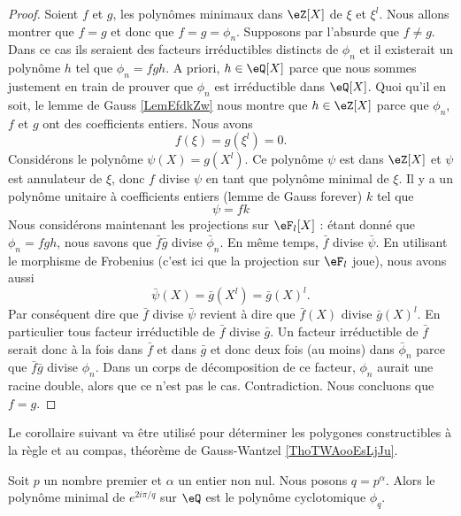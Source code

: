 \begin{proof}
    Soient \( f\) et \( g\), les polynômes minimaux dans \( \eZ[X]\) de \( \xi\) et \( \xi^l\). Nous allons montrer que \( f=g\) et donc que \( f=g=\phi_n\). Supposons par l'absurde que \( f\neq g\). Dans ce cas ils seraient des facteurs irréductibles distincts de \( \phi_n\) et il existerait un polynôme \( h\) tel que \( \phi_n=fgh\). A priori, \( h\in \eQ[X]\) parce que nous sommes justement en train de prouver que \( \phi_n\) est irréductible dans \( \eQ[X]\). Quoi qu'il en soit, le lemme de Gauss \ref{LemEfdkZw} nous montre que \( h\in \eZ[X]\) parce que \( \phi_n\), \( f\) et \( g\) ont des coefficients entiers. Nous avons
    \begin{equation}
        f(\xi)=g(\xi^l)=0.
    \end{equation}
    Considérons le polynôme \( \psi(X)=g(X^l)\). Ce polynôme \( \psi\) est dans \( \eZ[X]\) et \( \psi\) est annulateur de \( \xi\), donc \( f\) divise \( \psi\) en tant que polynôme minimal de \( \xi\). Il y a un polynôme unitaire à coefficients entiers (lemme de Gauss forever) \( k\) tel que
    \begin{equation}
        \psi=fk
    \end{equation}
    Nous considérons maintenant les projections sur \( \eF_l[X]\) : étant donné que \( \phi_n=fgh\), nous savons que \( \bar f\bar g\) divise \( \bar\phi_n\). En même temps, \( \bar f\) divise \( \bar \psi\). En utilisant le morphisme de Frobenius (c'est ici que la projection sur \( \eF_l\) joue), nous avons aussi
    \begin{equation}
        \bar\psi(X)=\bar g(X^l)=\bar g(X)^l.
    \end{equation}
    Par conséquent dire que \( \bar f\) divise \( \bar\psi\) revient à dire que \( \bar f(X)\) divise \( \bar g(X)^l\). En particulier tous facteur irréductible de \( \bar f\) divise \( \bar g\). Un facteur irréductible de \( \bar f\) serait donc à la fois dans \( \bar f\) et dans \( \bar g\) et donc deux fois (au moins) dans \( \bar\phi_n\) parce que \( \bar f\bar g\) divise \( \phi_n\). Dans un corps de décomposition de ce facteur, \( \phi_n\) aurait une racine double, alors que ce n'est pas le cas. Contradiction. Nous concluons que \( f=g\).
\end{proof}

Le corollaire suivant va être utilisé pour déterminer les polygones constructibles à la règle et au compas, théorème de Gauss-Wantzel \ref{ThoTWAooEsLjJu}.
\begin{corollary}   \label{CorKRTooTJtyvP}
    Soit \( p\) un nombre premier et \( \alpha\) un entier non nul. Nous posons \( q=p^{\alpha}\). Alors le polynôme minimal de \(  e^{2 i\pi/q}\) sur \( \eQ\) est le polynôme cyclotomique \( \phi_q\).
\end{corollary}

